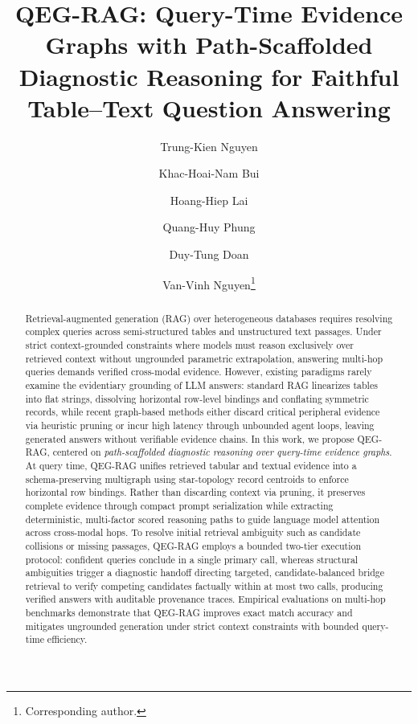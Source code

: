 \documentclass[runningheads]{llncs}
\begin{document}
\title{QEG-RAG: Query-Time Evidence Graphs with Path-Scaffolded Diagnostic Reasoning for Faithful Table--Text Question Answering}
\author{Trung-Kien Nguyen \and
Khac-Hoai-Nam Bui \and
Hoang-Hiep Lai \and
Quang-Huy Phung \and
Duy-Tung Doan \and
Van-Vinh Nguyen\thanks{Corresponding author.}}
%
%
\maketitle

\begin{abstract}
Retrieval-augmented generation (RAG) over heterogeneous databases requires resolving complex queries across semi-structured tables and unstructured text passages. Under strict context-grounded constraints where models must reason exclusively over retrieved context without ungrounded parametric extrapolation, answering multi-hop queries demands verified cross-modal evidence. However, existing paradigms rarely examine the evidentiary grounding of LLM answers: standard RAG linearizes tables into flat strings, dissolving horizontal row-level bindings and conflating symmetric records, while recent graph-based methods either discard critical peripheral evidence via heuristic pruning or incur high latency through unbounded agent loops, leaving generated answers without verifiable evidence chains. In this work, we propose QEG-RAG, centered on \emph{path-scaffolded diagnostic reasoning over query-time evidence graphs}. At query time, QEG-RAG unifies retrieved tabular and textual evidence into a schema-preserving multigraph using star-topology record centroids to enforce horizontal row bindings. Rather than discarding context via pruning, it preserves complete evidence through compact prompt serialization while extracting deterministic, multi-factor scored reasoning paths to guide language model attention across cross-modal hops. To resolve initial retrieval ambiguity such as candidate collisions or missing passages, QEG-RAG employs a bounded two-tier execution protocol: confident queries conclude in a single primary call, whereas structural ambiguities trigger a diagnostic handoff directing targeted, candidate-balanced bridge retrieval to verify competing candidates factually within at most two calls, producing verified answers with auditable provenance traces. Empirical evaluations on multi-hop benchmarks demonstrate that QEG-RAG improves exact match accuracy and mitigates ungrounded generation under strict context constraints with bounded query-time efficiency.

\end{abstract}
\end{document}
